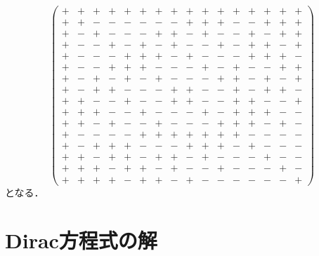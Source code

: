 \[
\begin{pmatrix}
   +  &  +  &  +  &  +  &  +  &  +  &  +  &  +  &  +  &  +  &  +  &  +  &  +  &  +  &  +  &  +  \\
   +  &  +  &  -  &  -  &  -  &  -  &  -  &  -  &  +  &  +  &  +  &  -  &  -  &  +  &  +  &  +  \\
   +  &  -  &  +  &  -  &  -  &  -  &  +  &  +  &  -  &  +  &  -  &  -  &  +  &  -  &  +  &  +  \\
   +  &  -  &  -  &  +  &  -  &  +  &  -  &  +  &  -  &  -  &  +  &  -  &  +  &  +  &  -  &  +  \\
   +  &  -  &  -  &  -  &  +  &  +  &  +  &  -  &  +  &  -  &  -  &  -  &  +  &  +  &  +  &  -  \\
   +  &  -  &  -  &  +  &  +  &  +  &  -  &  -  &  -  &  +  &  -  &  +  &  -  &  -  &  +  &  +  \\
   +  &  -  &  +  &  -  &  +  &  -  &  +  &  -  &  -  &  -  &  +  &  +  &  -  &  +  &  -  &  +  \\
   +  &  -  &  +  &  +  &  -  &  -  &  -  &  +  &  +  &  -  &  -  &  +  &  -  &  +  &  +  &  -  \\
   +  &  +  &  -  &  -  &  +  &  -  &  -  &  +  &  +  &  -  &  -  &  +  &  +  &  -  &  -  &  +  \\
   +  &  +  &  +  &  -  &  -  &  +  &  -  &  -  &  -  &  +  &  -  &  +  &  +  &  +  &  -  &  -  \\
   +  &  +  &  -  &  +  &  -  &  -  &  +  &  -  &  -  &  -  &  +  &  +  &  +  &  -  &  +  &  -  \\
   +  &  -  &  -  &  -  &  -  &  +  &  +  &  +  &  +  &  +  &  +  &  +  &  -  &  -  &  -  &  -  \\
   +  &  -  &  +  &  +  &  +  &  -  &  -  &  -  &  +  &  +  &  +  &  -  &  +  &  -  &  -  &  -  \\
   +  &  +  &  -  &  +  &  +  &  -  &  +  &  +  &  -  &  +  &  -  &  -  &  -  &  +  &  -  &  -  \\
   +  &  +  &  +  &  -  &  +  &  +  &  -  &  +  &  -  &  -  &  +  &  -  &  -  &  -  &  +  &  -  \\
   +  &  +  &  +  &  +  &  -  &  +  &  +  &  -  &  +  &  -  &  -  &  -  &  -  &  -  &  -  &  +
\end{pmatrix}
\]
となる．

\chapter{Dirac方程式の解}

